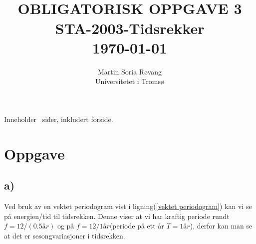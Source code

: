 
\usepackage{gensymb}
\usepackage{amsmath}
\usepackage{amsfonts}
\usepackage[section]{placeins}



{\selectfont
\title{ \normalsize \textsc{}
		\\ [1.0cm] %
        \LARGE \textbf{\uppercase{Obligatorisk Oppgave 3}
        \HRule{0.5pt} \\ [0.5cm]
        STA-2003-Tidsrekker
        \\
		\normalsize \today \vspace*{5\baselineskip}}
		}

        \date{}
\author{
		Martin Soria Røvang \\ 
        Universitetet i Tromsø\\}

\clearpage\maketitle
\vspace{0.2\textheight}
{\centering
Inneholder \pageref{LastPage} \, sider, inkludert forside.\par
}}
\thispagestyle{empty}

\newpage
\tableofcontents

\newpage

\section{Oppgave}
\subsection{a)}

Ved bruk av en vektet periodogram vist i ligning(\ref{vektet periodogram}) kan vi se på energien/tid til tidsrekken. Denne viser at vi har kraftig periode rundt $f = 12/(0.5år)$ og på $f = 12/1år$(periode på ett år $T = 1 år$), derfor kan man se at det er sesongvariasjoner i tidsrekken.

